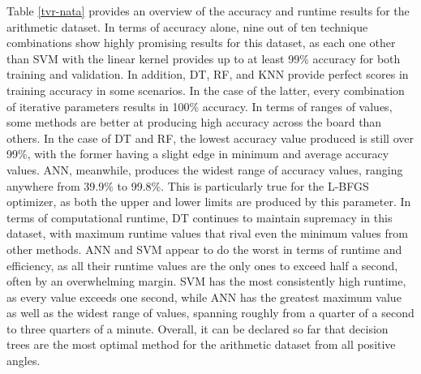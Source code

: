 \documentclass[12pt]{uthesis-v12}  %
\begin{document}
Table \ref{tvr-nata} provides an overview of the accuracy and runtime results for the arithmetic dataset. In terms of accuracy alone, nine out of ten technique combinations show highly promising results for this dataset, as each one other than SVM with the linear kernel provides up to at least 99\% accuracy for both training and validation. In addition, DT, RF, and KNN provide perfect scores in training accuracy in some scenarios. In the case of the latter, every combination of iterative parameters results in 100\% accuracy. In terms of ranges of values, some methods are better at producing high accuracy across the board than others. In the case of DT and RF, the lowest accuracy value produced is still over 99\%, with the former having a slight edge in minimum and average accuracy values. ANN, meanwhile, produces the widest range of accuracy values, ranging anywhere from 39.9\% to 99.8\%. This is particularly true for the L-BFGS optimizer, as both the upper and lower limits are produced by this parameter. In terms of computational runtime, DT continues to maintain supremacy in this dataset, with maximum runtime values that rival even the minimum values from other methods. ANN and SVM appear to do the worst in terms of runtime and efficiency, as all their runtime values are the only ones to exceed half a second, often by an overwhelming margin. SVM has the most consistently high runtime, as every value exceeds one second, while ANN has the greatest maximum value as well as the widest range of values, spanning roughly from a quarter of a second to three quarters of a minute. Overall, it can be declared so far that decision trees are the most optimal method for the arithmetic dataset from all positive angles.
\end{document}
